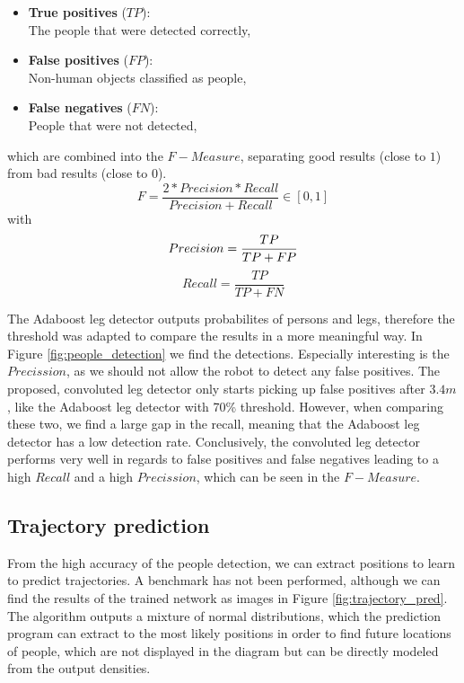 \begin{itemize}
	\item \textbf{True positives} ($TP$):\\The people that were detected correctly,
	\item \textbf{False positives} ($FP$):\\Non-human objects classified as people,
	\item \textbf{False negatives} ($FN$):\\People that were not detected,
\end{itemize}
which are combined into the $F-Measure$, separating good results (close to $1$) from bad results (close to $0$).
\begin{equation}
	F=\frac{2*Precision*Recall}{Precision+Recall} \in \left[ 0,1 \right]
\end{equation}
with
\begin{equation}
	Precision = \frac{TP}{TP + FP}\\
\end{equation}
\begin{equation}
	Recall = \frac{TP}{TP + FN}
\end{equation}

The Adaboost leg detector outputs probabilites of persons and legs, therefore the threshold was adapted to compare the results in a more meaningful way. In Figure \ref{fig:people_detection} we find the detections. Especially interesting is the $Precission$, as we should not allow the robot to detect any false positives. The proposed, convoluted leg detector only starts picking up false positives after $3.4 m$, like the Adaboost leg detector with 70\% threshold. However, when comparing these two, we find a large gap in the recall, meaning that the Adaboost leg detector has a low detection rate.
Conclusively, the convoluted leg detector performs very well in regards to false positives and false negatives leading to a high $Recall$ and a high $Precission$, which can be seen in the $F-Measure$.


\subsection{Trajectory prediction}

From the high accuracy of the people detection, we can extract positions to learn to predict trajectories. A benchmark has not been performed, although we can find the results of the trained network as images in Figure \ref{fig:trajectory_pred}. The algorithm outputs a mixture of normal distributions, which the prediction program can extract to the most likely positions in order to find future locations of people, which are not displayed in the diagram but can be directly modeled from the output densities.

